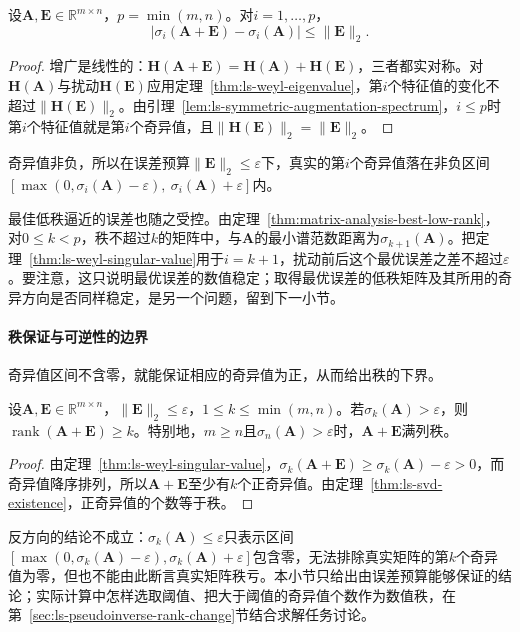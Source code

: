 \begin{theorem}[奇异值的Weyl界]
\label{thm:ls-weyl-singular-value}
设$\bm A,\bm E\in\mathbb R^{m\times n}$，$p=\min(m,n)$。对$i=1,\ldots,p$，
\begin{equation}
 |\sigma_i(\bm A+\bm E)-\sigma_i(\bm A)|\leq\lVert\bm E\rVert_2 .
 \label{eq:matrix-analysis-singular-value-perturbation}
\end{equation}
\end{theorem}
\begin{proof}
增广是线性的：$\bm H(\bm A+\bm E)=\bm H(\bm A)+\bm H(\bm E)$，三者都实对称。对$\bm H(\bm A)$与扰动$\bm H(\bm E)$应用定理~\ref{thm:ls-weyl-eigenvalue}，第$i$个特征值的变化不超过$\lVert\bm H(\bm E)\rVert_2$。由引理~\ref{lem:ls-symmetric-augmentation-spectrum}，$i\leq p$时第$i$个特征值就是第$i$个奇异值，且$\lVert\bm H(\bm E)\rVert_2=\lVert\bm E\rVert_2$。
\end{proof}
奇异值非负，所以在误差预算$\lVert\bm E\rVert_2\leq\varepsilon$下，真实的第$i$个奇异值落在非负区间$[\max(0,\sigma_i(\bm A)-\varepsilon),\ \sigma_i(\bm A)+\varepsilon]$内。

最佳低秩逼近的误差也随之受控。由定理~\ref{thm:matrix-analysis-best-low-rank}，对$0\leq k<p$，秩不超过$k$的矩阵中，与$\bm A$的最小谱范数距离为$\sigma_{k+1}(\bm A)$。把定理~\ref{thm:ls-weyl-singular-value}用于$i=k+1$，扰动前后这个最优误差之差不超过$\varepsilon$。要注意，这只说明最优误差的数值稳定；取得最优误差的低秩矩阵及其所用的奇异方向是否同样稳定，是另一个问题，留到下一小节。

\paragraph{秩保证与可逆性的边界}

奇异值区间不含零，就能保证相应的奇异值为正，从而给出秩的下界。
\begin{theorem}[由奇异值保证秩]
\label{thm:ls-singular-value-rank-guarantee}
设$\bm A,\bm E\in\mathbb R^{m\times n}$，$\lVert\bm E\rVert_2\leq\varepsilon$，$1\leq k\leq\min(m,n)$。若$\sigma_k(\bm A)>\varepsilon$，则$\operatorname{rank}(\bm A+\bm E)\geq k$。特别地，$m\geq n$且$\sigma_n(\bm A)>\varepsilon$时，$\bm A+\bm E$满列秩。
\end{theorem}
\begin{proof}
由定理~\ref{thm:ls-weyl-singular-value}，$\sigma_k(\bm A+\bm E)\geq\sigma_k(\bm A)-\varepsilon>0$，而奇异值降序排列，所以$\bm A+\bm E$至少有$k$个正奇异值。由定理~\ref{thm:ls-svd-existence}，正奇异值的个数等于秩。
\end{proof}
反方向的结论不成立：$\sigma_k(\bm A)\leq\varepsilon$只表示区间$[\max(0,\sigma_k(\bm A)-\varepsilon),\sigma_k(\bm A)+\varepsilon]$包含零，无法排除真实矩阵的第$k$个奇异值为零，但也不能由此断言真实矩阵秩亏。本小节只给出由误差预算能够保证的结论；实际计算中怎样选取阈值、把大于阈值的奇异值个数作为数值秩，在第~\ref{sec:ls-pseudoinverse-rank-change}节结合求解任务讨论。

